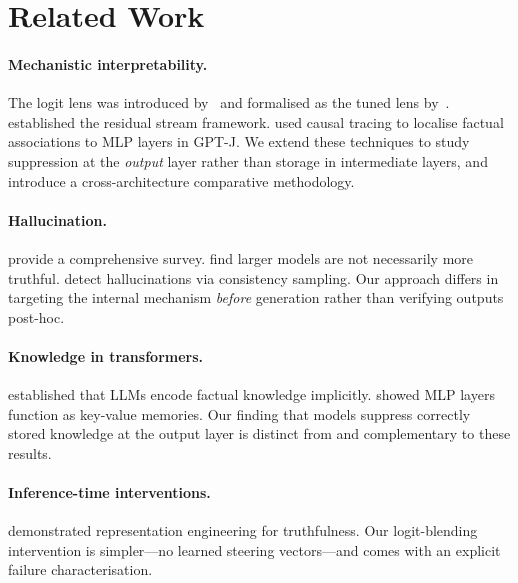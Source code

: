 \documentclass{article}
\begin{document}
\section{Related Work}

\paragraph{Mechanistic interpretability.}
The logit lens was introduced by~\citet{nostalgebraist2020logitlens} and
formalised as the tuned lens by~\citet{belrose2023eliciting}.
\citet{elhage2021mathematical} established the residual stream framework.
\citet{meng2022locating} used causal tracing to localise factual associations
to MLP layers in GPT-J.
We extend these techniques to study suppression at the \emph{output} layer
rather than storage in intermediate layers, and introduce a cross-architecture
comparative methodology.

\paragraph{Hallucination.}
\citet{ji2023survey} provide a comprehensive survey.
\citet{lin2022truthfulqa} find larger models are not necessarily more truthful.
\citet{manakul2023selfcheckgpt} detect hallucinations via consistency sampling.
Our approach differs in targeting the internal mechanism \emph{before}
generation rather than verifying outputs post-hoc.

\paragraph{Knowledge in transformers.}
\citet{petroni2019language} established that LLMs encode factual knowledge
implicitly. \citet{geva2021transformer} showed MLP layers function as
key-value memories. Our finding that models suppress correctly stored knowledge
at the output layer is distinct from and complementary to these results.

\paragraph{Inference-time interventions.}
\citet{li2023inference} demonstrated representation engineering for
truthfulness. Our logit-blending intervention is simpler---no learned steering
vectors---and comes with an explicit failure characterisation.

\end{document}
